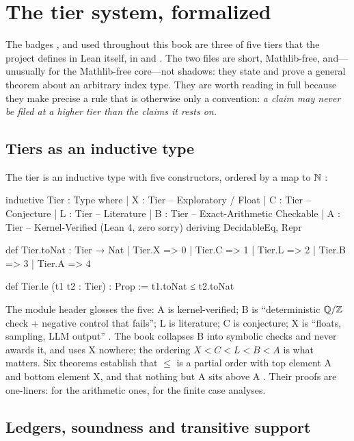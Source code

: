 \section{The tier system, formalized}\label{sec:architecture:epistemic}

The badges \TA, \TL{} and \TC{} used throughout this book are three of five tiers that
the project defines in Lean itself, in 
and . The two files are short, Mathlib-free, and---unusually for the
Mathlib-free core---not shadows: they state and prove a general theorem about an arbitrary
index type. They are worth reading in full because they make precise a rule that is
otherwise only a convention: \emph{a claim may never be filed at a higher tier than the
claims it rests on.}

\subsection{Tiers as an inductive type}

The tier is an inductive type with five constructors, ordered by a map to $\mathbb{N}$
:
\begin{leancode}
inductive Tier : Type where
  | X : Tier  -- Exploratory / Float
  | C : Tier  -- Conjecture
  | L : Tier  -- Literature
  | B : Tier  -- Exact-Arithmetic Checkable
  | A : Tier  -- Kernel-Verified (Lean 4, zero sorry)
deriving DecidableEq, Repr

def Tier.toNat : Tier → Nat
  | Tier.X => 0 | Tier.C => 1 | Tier.L => 2 | Tier.B => 3 | Tier.A => 4

def Tier.le (t1 t2 : Tier) : Prop := t1.toNat ≤ t2.toNat
\end{leancode}
The module header glosses the five: A is kernel-verified; B is ``deterministic
$\mathbb{Q}/\mathbb{Z}$ check + negative control that fails''; L is literature; C is conjecture; X is
``floats, sampling, LLM output'' . The book collapses B into
symbolic checks and never awards it, and uses X nowhere; the ordering $X<C<L<B<A$ is what
matters. Six theorems establish that $\le$ is a partial order with top element A and bottom
element X, and that nothing but A sits above A . Their
proofs are one-liners:  for the arithmetic ones,  for
the finite case analyses.

\subsection{Ledgers, soundness and transitive support}

